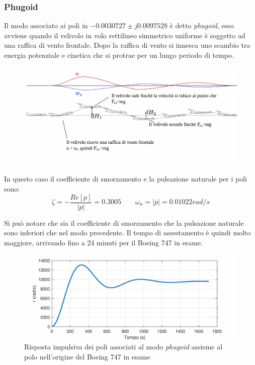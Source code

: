 \subsubsection{Phugoid}

Il modo associato ai poli in $-0.0030727 \pm j0.0097528$ è detto \textit{phugoid}, esso avviene quando il velivolo in volo rettilineo simmetrico uniforme è soggetto ad una raffica di vento frontale.
Dopo la raffica di vento si innesca uno scambio tra energia potenziale e cinetica che si protrae per un lungo periodo di tempo.

\begin{figure}[H]
    \centering
    \includegraphics[width=0.9\linewidth]{Immagini/phugoid_mode_physics.jpg}
\end{figure}

In questo caso il coefficiente di smorzamento e la pulsazione naturale per i poli sono:
\begin{equation*}
    \zeta = - \frac{Re[p]}{\left|p\right|} = 0.3005 \qquad \omega_n = \left|p\right| = 0.01022rad/s
\end{equation*}

Si può notare che sia il coefficiente di smorzamento che la pulsazione naturale sono inferiori che nel modo precedente. Il tempo di assestamento è quindi molto maggiore, arrivando fino a 24 minuti per il Boeing 747 in esame.
\begin{figure}[H]
    \centering
    \includegraphics[width=0.7\linewidth]{Immagini/phugoid_mode.pdf}
    \caption{Risposta impulsiva dei poli associati al modo \textit{phugoid} assieme al polo nell'origine  del Boeing 747 in esame}
\end{figure}

